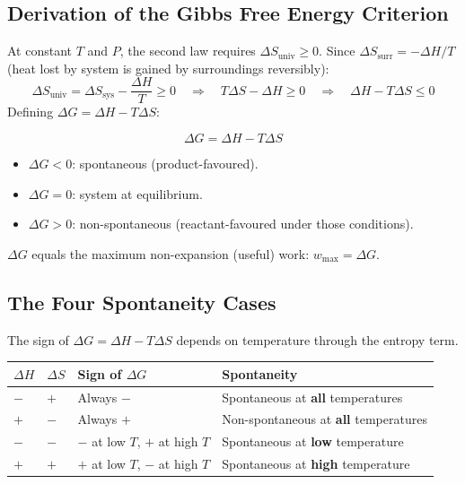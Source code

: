 \documentclass[12pt,a4paper]{article}
\begin{document}
\subsection{Derivation of the Gibbs Free Energy Criterion}
At constant $T$ and $P$, the second law requires $\Delta S_{\mathrm{univ}} \geq 0$. Since $\Delta S_{\mathrm{surr}} = -\Delta H / T$ (heat lost by system is gained by surroundings reversibly):
\[
\Delta S_{\mathrm{univ}} = \Delta S_{\mathrm{sys}} - \frac{\Delta H}{T} \geq 0
\quad\Rightarrow\quad T\Delta S - \Delta H \geq 0
\quad\Rightarrow\quad \Delta H - T\Delta S \leq 0
\]
Defining $\Delta G = \Delta H - T\Delta S$:

\begin{tcolorbox}[formulabox, title={Gibbs Free Energy Criterion}]
\[
\Delta G = \Delta H - T\Delta S
\]
\begin{itemize}[leftmargin=*, itemsep=1pt, topsep=2pt]
  \item $\Delta G < 0$: spontaneous (product-favoured).
  \item $\Delta G = 0$: system at equilibrium.
  \item $\Delta G > 0$: non-spontaneous (reactant-favoured under those conditions).
\end{itemize}
$\Delta G$ equals the maximum non-expansion (useful) work: $w_{\mathrm{max}} = \Delta G$.
\end{tcolorbox}

\subsection{The Four Spontaneity Cases}
The sign of $\Delta G = \Delta H - T\Delta S$ depends on temperature through the entropy term.

\begin{tabularx}{\linewidth}{|B{1.8cm}|B{1.8cm}|Y|Y|}
\hline
\textbf{$\Delta H$} & \textbf{$\Delta S$} & \textbf{Sign of $\Delta G$} & \textbf{Spontaneity} \\
\hline
$-$ & $+$ & Always $-$ & Spontaneous at \textbf{all} temperatures \\
\hline
$+$ & $-$ & Always $+$ & Non-spontaneous at \textbf{all} temperatures \\
\hline
$-$ & $-$ & $-$ at low $T$, $+$ at high $T$ & Spontaneous at \textbf{low} temperature \\
\hline
$+$ & $+$ & $+$ at low $T$, $-$ at high $T$ & Spontaneous at \textbf{high} temperature \\
\hline
\end{tabularx}
\end{document}
